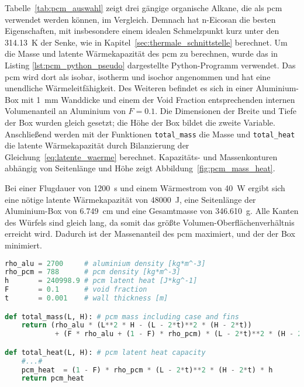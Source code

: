 Tabelle~\ref{tab:pcm_auswahl} zeigt drei gängige organische Alkane, die als \ac{pcm} verwendet werden können, im Vergleich.
Demnach hat n-Eicosan die besten Eigenschaften, mit insbesondere einem idealen Schmelzpunkt kurz unter den \SI{314,13}{\kelvin} der Senke,
wie in Kapitel~\ref{sec:thermale_schnittstelle} berechnet.
Um die Masse und latente Wärmekapazität des \ac{pcm} zu berechnen, wurde das in Listing \ref{lst:pcm_python_pseudo} dargestellte Python-Programm verwendet.
Das \ac{pcm} wird dort als isobar, isotherm und isochor angenommen und hat eine unendliche Wärmeleitfähigkeit. Des Weiteren befindet es sich
in einer Aluminium-Box mit \SI{1}{\milli\meter} Wanddicke und einem der Void Fraction entsprechenden internen Volumenanteil an  Aluminium von $F = 0.1$.
Die Dimensionen der Breite und Tiefe der Box wurden gleich gesetzt; die Höhe der Box bildet die zweite Variable.
Anschließend werden mit der Funktionen \texttt{total\_mass} die Masse und \texttt{total\_heat} die latente Wärmekapazität durch Bilanzierung
der Gleichung~\ref{eq:latente_waerme} berechnet.
Kapazitäts- und Massenkonturen abhängig von Seitenlänge und Höhe zeigt Abbildung~\ref{fig:pcm_mass_heat}.

Bei einer Flugdauer von \SI{1200}{\second} und einem Wärmestrom von \SI{40}{\watt} ergibt sich eine nötige latente Wärmekapazität von
\SI{48000}{\joule}, eine Seitenlänge der Aluminium-Box von \SI{6,749}{\centi\meter} und eine Gesamtmasse von \SI{346,610}{\gram}.
Alle Kanten des Würfels sind gleich lang, da somit das größte Volumen-Oberflächenverhältnis erreicht wird. Dadurch ist der Massenanteil des \ac{pcm}
maximiert, und der der Box minimiert.

\begin{lstlisting}[float, language=Python, caption={Berechnung der Masse und latenten Wärmekapazität des \acs{pcm} in der pcm.py.}, label={lst:pcm_python_pseudo}]
rho_alu = 2700     # aluminium density [kg*m^-3]
rho_pcm = 788      # pcm density [kg*m^-3]
h       = 240998.9 # pcm latent heat [J*kg^-1]
F       = 0.1      # void fraction
t       = 0.001    # wall thickness [m]

def total_mass(L, H): # pcm mass including case and fins
    return (rho_alu * (L**2 * H - (L - 2*t)**2 * (H - 2*t))
            + (F * rho_alu + (1 - F) * rho_pcm) * (L - 2*t)**2 * (H - 2*t)) 

def total_heat(L, H): # pcm latent heat capacity
    #...#
    pcm_heat  = (1 - F) * rho_pcm * (L - 2*t)**2 * (H - 2*t) * h
    return pcm_heat
\end{lstlisting}

